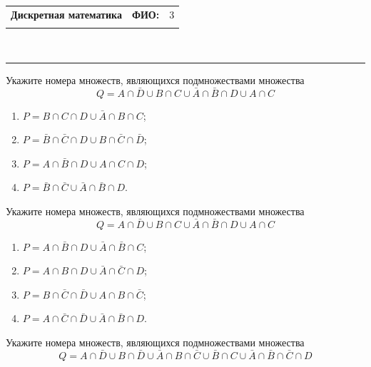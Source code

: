 \documentclass[10pt]{exam}
\newcommand{\class}{Дискретная математика}
\newcommand{\examdate}{}
\begin{document}
\newpage
\begin{flushright}
\begin{tabular}{p{2.8in} r l}
\textbf{\class} & \textbf{ФИО:} &3\\

\textbf{\examdate} &&\\
\end{tabular}\\
\end{flushright}
\rule[1ex]{\textwidth}{.1pt}


\begin{questions}
\question
Укажите номера множеств, являющихся подмножествами множества
\begin{equation*}
	Q = A \cap \bar{D} \cup B \cap C \cup \bar{A} \cap \bar{B} \cap D \cup A \cap C
\end{equation*}

\begin{enumerate}
	\renewcommand{\labelenumi}{\arabic{enumi})}
	\item $P = B \cap C \cap D \cup \bar{A} \cap B \cap C$;
	\item $P = \bar{B} \cap \bar{C} \cap D \cup B \cap \bar{C} \cap \bar{D}$;
	\item $P = A \cap \bar{B} \cap D \cup A \cap C \cap D$;
	\item $P = \bar{B} \cap \bar{C} \cup \bar{A} \cap \bar{B} \cap D$.
\end{enumerate}
\question
Укажите номера множеств, являющихся подмножествами множества
\begin{equation*}
	Q = A \cap \bar{D} \cup B \cap C \cup \bar{A} \cap \bar{B} \cap D \cup A \cap C
\end{equation*}

\begin{enumerate}
	\renewcommand{\labelenumi}{\arabic{enumi})}
	\item $P = A \cap \bar{B} \cap D \cup \bar{A} \cap \bar{B} \cap C$;
	\item $P = A \cap B \cap D \cup \bar{A} \cap \bar{C} \cap D$;
	\item $P = B \cap \bar{C} \cap \bar{D} \cup A \cap B \cap \bar{C}$;
	\item $P = A \cap \bar{C} \cap \bar{D} \cup \bar{A} \cap \bar{B} \cap D$.
\end{enumerate}
\question
Укажите номера множеств, являющихся подмножествами множества
\begin{equation*}
	Q = A \cap \bar{D} \cup B \cap \bar{D} \cup \bar{A} \cap B \cap \bar{C} \cup \bar{B} \cap C \cup \bar{A} \cap \bar{B} \cap \bar{C} \cap D
\end{equation*}


\end{questions}
\end{document}
